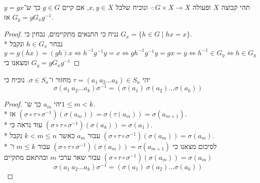 \Subquestion{}
תהי קבוצה $X$ ופעולה $\cdot : G \times X \to X$ ונוכיח שלכל $x, y \in X$, אם קיים $g \in G$ כך ש־$y = gx$ אז $G_y = g G_x g^{-1}$.
\begin{proof}
	נניח כי התנאים מתקיימים, נבחין כי $G_x = \{ h \in G \mid h x = x \}$. \\*
	נבחר $h \in G_x$ ונקבל
	\[
		y = g(hx) = (gh) x \iff h^{-1} g^{-1} y = x \iff g h^{-1} g^{-1} y = gx = y \iff h^{-1} \in G_y \iff h \in G_y
	\]
	ומצאנו כי $G_y = g G_x g^{-1}$
\end{proof}

\Question{}
\Subquestion{}
יהי $\tau = (a_1\ a_2 \dots a_k) \in S_n$ מחזור ו־$\sigma \in S_n$. נוכיח כי
\[
	\sigma (a_1\ a_2 \dots a_k) \sigma^{-1} = (\sigma(a_1)\ \sigma(a_2) \dots \sigma(a_k))
\]
\begin{proof}
	יהי $a_m$ כך ש־$1 \le m < k$. \\*
	אז $(\sigma \circ \tau \circ \sigma^{-1})(\sigma(a_m)) = \sigma(\tau(a_m)) = \sigma(a_{m + 1})$. \\*
	עוד נראה כי $(\sigma \circ \tau \circ \sigma^{-1})(\sigma(a_k)) = \sigma(a_1)$. \\*
	עבור $a_m$ כאשר $k < m \le n$ נקבל $(\sigma \circ \tau \circ \sigma^{-1})(\sigma(a_m)) = \sigma(a_m)$. \\*
	לסיכום מצאנו כי $(\sigma \circ \tau \circ \sigma^{-1})(\sigma(a_m)) = \sigma(a_{m + 1})$ עבור $m \le k$ ו־$(\sigma \circ \tau \circ \sigma^{-1})(\sigma(a_m)) = \sigma(a_m)$ עבור שאר ערכי $m$ ובהתאם מתקיים
	\[
		\sigma (a_1\ a_2 \dots a_k) \sigma^{-1} = (\sigma(a_1)\ \sigma(a_2) \dots \sigma(a_k))
	\]
\end{proof}


